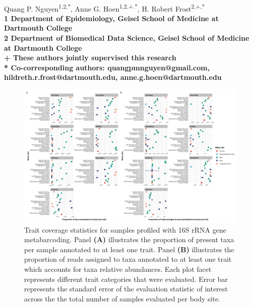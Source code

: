 \documentclass[10pt,letterpaper]{article}
\begin{document}
\vspace*{0.35in}

\begin{flushleft}
{\Large
\textbf{}
}
\newline
\\
Quang P. Nguyen\textsuperscript{1,2,*},
Anne G. Hoen\textsuperscript{1,2,+.*},
H. Robert Frost\textsuperscript{2,+,*}
\\
\bigskip
\bf{1} Department of Epidemiology, Geisel School of Medicine at Dartmouth College
\\
\bf{2} Department of Biomedical Data Science, Geisel School of Medicine at Dartmouth College
\\
\bigskip
+ These authors jointly supervised this research \\

* Co-corresponding authors: quangpmnguyen@gmail.com, hildreth.r.frost@dartmouth.edu, anne.g.hoen@dartmouth.edu

\end{flushleft}



\begin{figure}[!h]
\includegraphics[width=0.99\linewidth]{figures/coverage_16s.png}
\caption{Trait coverage statistics for samples profiled with 16S rRNA gene metabarcoding. Panel \textbf{(A)} illustrates the proportion of present taxa per sample annotated to at least one trait. Panel \textbf{(B)} illustrates the proportion of reads assigned to taxa annotated to at least one trait which accounts for taxa relative abundances. Each plot facet represents different trait categories that were evaluated. Error bar represents the standard error of the evaluation statistic of interest across the the total number of samples evaluated per body site.}
\label{fig:s1}
\end{figure}
\end{document}
